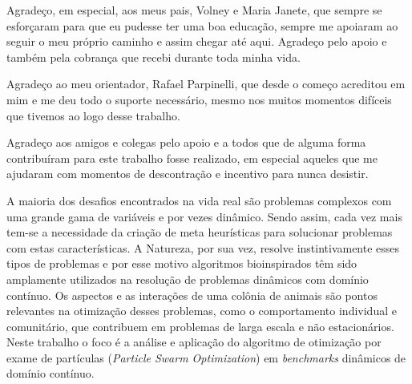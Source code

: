 
\bacharelado {}
\data {\today}



\ttorientador{$ $}
\ttexaminadorum{$ $}
\ttexaminadordois{$ $}

\newpage
\pagestyle{empty}

\maketitle

Agradeço, em especial, aos meus pais, Volney e Maria Janete, que sempre se esforçaram para que eu pudesse ter uma boa educação, sempre me apoiaram ao seguir o meu próprio caminho e assim chegar até aqui. Agradeço
pelo apoio e também pela cobrança que recebi durante toda minha vida.

Agradeço ao meu orientador, Rafael Parpinelli, que desde o começo
acreditou em mim e me deu todo o suporte necessário, mesmo nos muitos momentos difíceis que tivemos ao logo desse trabalho.

Agradeço aos amigos e colegas pelo apoio e a todos que de alguma forma
contribuíram para este trabalho fosse realizado, em especial aqueles que me ajudaram com momentos de descontração e incentivo para nunca desistir.



A maioria dos desafios encontrados na vida real são problemas complexos com uma grande gama de variáveis e por vezes dinâmico. Sendo assim, cada vez mais tem-se a necessidade da criação de meta heurísticas para solucionar problemas com estas características. A Natureza, por sua vez, resolve instintivamente esses tipos de problemas e por esse motivo algoritmos bioinspirados têm sido amplamente utilizados na resolução de problemas dinâmicos com domínio contínuo. Os aspectos e as interações de uma colônia de animais são pontos relevantes na otimização desses problemas, como o comportamento individual e comunitário, que contribuem em problemas de larga escala e não estacionários. Neste trabalho o foco é a análise e aplicação do algoritmo de otimização por exame de partículas (\textit{Particle Swarm Optimization}) em \textit{benchmarks} dinâmicos de domínio contínuo.

